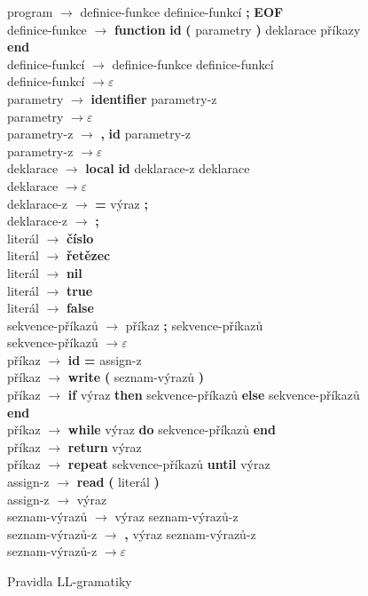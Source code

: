 \begin{figure}
program $ \rightarrow $ definice-funkce   definice-funkcí   \textbf{;}   \textbf{EOF} \\
definice-funkce $ \rightarrow $	\textbf{function} \textbf{id} \textbf{(} parametry \textbf{)} deklarace příkazy \textbf{end} \\
definice-funkcí $ \rightarrow $ definice-funkce   definice-funkcí \\
definice-funkcí $ \rightarrow \varepsilon $ \\
parametry $ \rightarrow $	\textbf{identifier}   parametry-z \\
parametry $ \rightarrow \varepsilon $ \\
parametry-z $ \rightarrow $ \textbf{,}   \textbf{id} parametry-z \\
parametry-z $ \rightarrow 	\varepsilon $ \\
deklarace $ \rightarrow $	\textbf{local} \textbf{id} deklarace-z   deklarace \\
deklarace $ \rightarrow \varepsilon $ \\
deklarace-z $ \rightarrow $ \textbf{=} výraz \textbf{;} \\
deklarace-z $ \rightarrow $ \textbf{;} \\
literál $ \rightarrow $	\textbf{číslo} \\
literál $ \rightarrow $ \textbf{řetězec} \\
literál $ \rightarrow $ \textbf{nil} \\
literál $ \rightarrow $ \textbf{true} \\
literál $ \rightarrow $ \textbf{false} \\ 
sekvence-příkazů $ \rightarrow $	příkaz   \textbf{;}   sekvence-příkazů \\
sekvence-příkazů $ \rightarrow \varepsilon $ \\
příkaz $ \rightarrow $	\textbf{id} \textbf{=} assign-z \\
příkaz $ \rightarrow $	\textbf{write} \textbf{(} seznam-výrazů \textbf{)} \\
příkaz $ \rightarrow $	\textbf{if} výraz \textbf{then} sekvence-příkazů \textbf{else} sekvence-příkazů \textbf{end} \\
příkaz $ \rightarrow $	\textbf{while} výraz \textbf{do} sekvence-příkazů \textbf{end} \\
příkaz $ \rightarrow $	\textbf{return} výraz \\
příkaz $ \rightarrow $	\textbf{repeat} sekvence-příkazů \textbf{until} výraz \\
assign-z $ \rightarrow $ \textbf{read}   \textbf{(}  literál \textbf{)} \\
assign-z $ \rightarrow $ výraz \\
seznam-výrazů $ \rightarrow $ výraz seznam-výrazů-z \\
seznam-výrazů-z $ \rightarrow $ \textbf{,} výraz seznam-výrazů-z \\
seznam-výrazů-z $ \rightarrow \varepsilon $ \\
\caption{Pravidla LL-gramatiky}
\end{figure}
